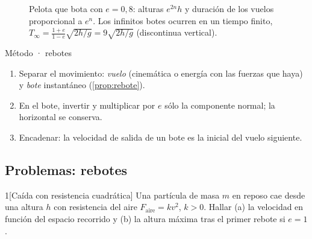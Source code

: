 \begin{figure}[ht]
\centering
{}
\caption{Pelota que bota con $e=0{,}8$: alturas $e^{2n}h$ y duración de los vuelos
proporcional a $e^{n}$. Los infinitos botes ocurren en un tiempo finito,
$T_{\infty}=\frac{1+e}{1-e}\sqrt{2h/g}=9\sqrt{2h/g}$ (discontinua vertical).}
\label{fig:bote}
\end{figure}

\begin{clave}{Método · rebotes}
\begin{enumerate}[leftmargin=1.4em]
  \item Separar el movimiento: \emph{vuelo} (cinemática o energía con las fuerzas que haya)
        y \emph{bote} instantáneo (\cref{prop:rebote}).
  \item En el bote, invertir y multiplicar por $e$ sólo la componente normal; la horizontal se conserva.
  \item Encadenar: la velocidad de salida de un bote es la inicial del vuelo siguiente.
\end{enumerate}
\end{clave}

\subsection{Problemas: rebotes}

\begin{problema}{1}[Caída con resistencia cuadrática]
\label{prob:1}
Una partícula de masa $m$ en reposo cae desde una altura $h$ con resistencia del aire
$F_{\mathrm{aire}}=kv^{2}$, $k>0$. Hallar (a) la velocidad en función del espacio recorrido y
(b) la altura máxima tras el primer rebote si $e=1$.
\end{problema}

